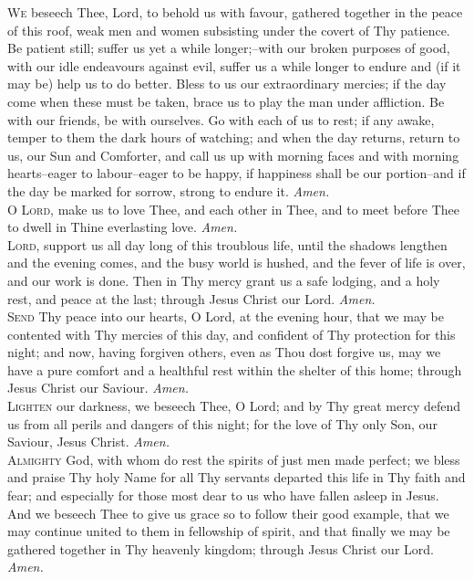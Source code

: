 \lettrine{W}{e} beseech Thee, Lord, to behold us with favour, gathered together in the peace of this roof, weak men and
women subsisting under the covert of Thy patience. Be
patient still; suffer us yet a while longer;--with our broken
purposes of good, with our idle endeavours against evil,
suffer us a while longer to endure and (if it may be) help
us to do better. Bless to us our extraordinary mercies; if
the day come when these must be taken, brace us to play
the man under affliction. Be with our friends, be with
ourselves. Go with each of us to rest; if any awake, temper to them the dark hours of watching; and when the day
returns, return to us, our Sun and Comforter, and call us
up with morning faces and with morning hearts--eager
to labour--eager to be happy, if happiness shall be our
portion--and if the day be marked for sorrow, strong to
endure it.
\textit{Amen.} \\

\lettrine{O}{ Lord,} make us to love Thee, and each other in Thee,
and to meet before Thee to dwell in Thine everlasting love.
\textit{Amen.} \\

\lettrine{L}{ord,} support us all day long of this troublous life,
until the shadows lengthen and the evening comes, and
the busy world is hushed, and the fever of life is over, and
our work is done. Then in Thy mercy grant us a safe
lodging, and a holy rest, and peace at the last; through
Jesus Christ our Lord.
\textit{Amen.} \\

\lettrine{S}{end} Thy peace into our hearts, O Lord, at the evening
hour, that we may be contented with Thy mercies of
this day, and confident of Thy protection for this night;
and now, having forgiven others, even as Thou dost forgive us, may we have a pure comfort and a healthful rest
within the shelter of this home; through Jesus Christ our Saviour.
\textit{Amen.} \\

\lettrine[lines=1]{L}{ighten} our darkness, we beseech Thee, O Lord; and
by Thy great mercy defend us from all perils and dangers of this night; for the love of Thy only Son, our Saviour, Jesus Christ.
\textit{Amen.} \\

\lettrine{A}{lmighty} God, with whom do rest the spirits of just
men made perfect; we bless and praise Thy holy Name
for all Thy servants departed this life in Thy faith and
fear; and especially for those most dear to us who have
fallen asleep in Jesus. And we beseech Thee to give us
grace so to follow their good example, that we may continue united to them in fellowship of spirit, and that finally
we may be gathered together in Thy heavenly kingdom;
through Jesus Christ our Lord.
\textit{Amen.} \\


